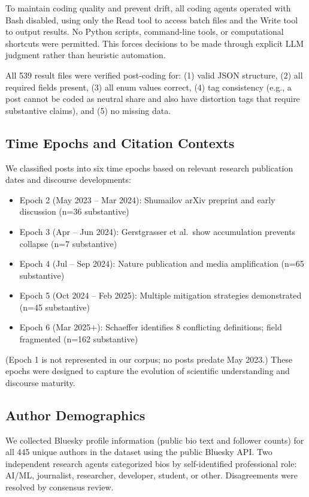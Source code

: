 \documentclass[twocolumn,11pt]{article}
\begin{document}
To maintain coding quality and prevent drift, all coding agents operated with Bash disabled, using only the Read tool to access batch files and the Write tool to output results. No Python scripts, command-line tools, or computational shortcuts were permitted. This forces decisions to be made through explicit LLM judgment rather than heuristic automation.

All 539 result files were verified post-coding for: (1) valid JSON structure, (2) all required fields present, (3) all enum values correct, (4) tag consistency (e.g., a post cannot be coded as neutral share and also have distortion tags that require substantive claims), and (5) no missing data.

\subsection{Time Epochs and Citation Contexts}

We classified posts into six time epochs based on relevant research publication dates and discourse developments:

\begin{itemize}
\item Epoch 2 (May 2023 -- Mar 2024): Shumailov arXiv preprint and early discussion (n=36 substantive)
\item Epoch 3 (Apr -- Jun 2024): Gerstgrasser et al.\ show accumulation prevents collapse (n=7 substantive)
\item Epoch 4 (Jul -- Sep 2024): Nature publication and media amplification (n=65 substantive)
\item Epoch 5 (Oct 2024 -- Feb 2025): Multiple mitigation strategies demonstrated (n=45 substantive)
\item Epoch 6 (Mar 2025+): Schaeffer identifies 8 conflicting definitions; field fragmented (n=162 substantive)
\end{itemize}

(Epoch 1 is not represented in our corpus; no posts predate May 2023.) These epochs were designed to capture the evolution of scientific understanding and discourse maturity.

\subsection{Author Demographics}

We collected Bluesky profile information (public bio text and follower counts) for all 445 unique authors in the dataset using the public Bluesky API. Two independent research agents categorized bios by self-identified professional role: AI/ML, journalist, researcher, developer, student, or other. Disagreements were resolved by consensus review.
\end{document}

